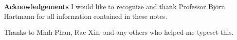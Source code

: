{\textbf{Acknowledgements}}
I would like to recognize and thank Professor Björn Hartmann for all information contained in these notes. 

Thanks to Minh Phan, Rae Xin, and any others who helped me typeset this.
